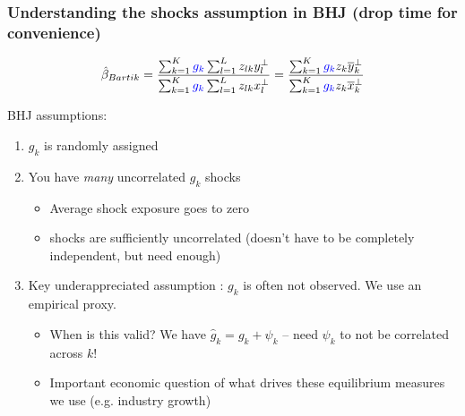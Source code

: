 \documentclass[notes,11pt, aspectratio=169]{beamer}
\begin{document}
  \begin{frame}
    \frametitle{Understanding the shocks assumption in BHJ (drop time for convenience)}

    $$\hat{\beta}_{Bartik}=  \frac{ \sum_{k=1}^K\textcolor{blue}{g_{k}}\sum_{l=1}^L   z_{lk}  y_{l}^\perp    }{   \sum_{k=1}^K  \textcolor{blue}{g_{k}}  \sum_{l=1}^L z_{lk}x_{l}^\perp   }   =  \frac{ \sum_{k=1}^K\textcolor{blue}{g_{k}} z_{k} \overline{y}_{k}^\perp    }{   \sum_{k=1}^K  \textcolor{blue}{g_{k}} z_{k} \overline{x}_{k}^\perp   } $$

    BHJ assumptions: 
    \begin{enumerate}
      \item $g_{k}$ is randomly assigned
      \item You have \emph{many} uncorrelated $g_{k}$ shocks 
      \begin{itemize}
        \item Average shock exposure goes to zero
        \item shocks are sufficiently uncorrelated (doesn't have to be completely independent, but need enough)
      \end{itemize}
      \item Key underappreciated assumption : $g_{k}$ is often not observed. We use an empirical proxy.
      \begin{itemize}
        \item When is this valid? We have $\hat{g}_{k} =  g_{k} + \psi_{k}$ -- need $\psi_{k}$ to not be correlated across $k$!
        \item Important economic question of what drives these equilibrium measures we use (e.g. industry growth)
      \end{itemize}

    \end{enumerate}
  \end{frame}
\end{document}
